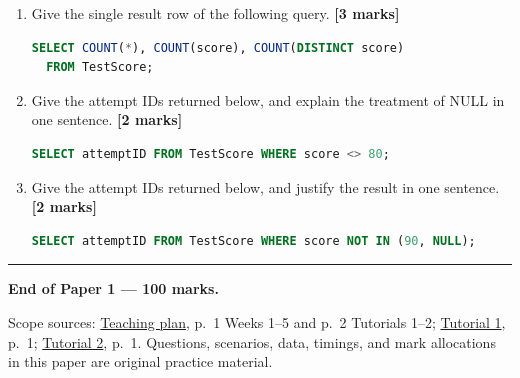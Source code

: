 \begin{enumerate}
\def\labelenumi{\arabic{enumi}.}
\item
  Give the single result row of the following query. \textbf{{[}3 marks{]}}

  \Needspace{60pt}
  \begin{lstlisting}[language=SQL]
  SELECT COUNT(*), COUNT(score), COUNT(DISTINCT score)
  FROM TestScore;
  \end{lstlisting}
\item
  Give the attempt IDs returned below, and explain the treatment of NULL in one sentence. \textbf{{[}2 marks{]}}

  \Needspace{45pt}
  \begin{lstlisting}[language=SQL]
  SELECT attemptID FROM TestScore WHERE score <> 80;
  \end{lstlisting}
\item
  Give the attempt IDs returned below, and justify the result in one sentence. \textbf{{[}2 marks{]}}

  \Needspace{45pt}
  \begin{lstlisting}[language=SQL]
  SELECT attemptID FROM TestScore WHERE score NOT IN (90, NULL);
  \end{lstlisting}
\end{enumerate}

\begin{center}\rule{0.5\linewidth}{0.5pt}\end{center}

\textbf{End of Paper 1 --- 100 marks.}

Scope sources: \href{../../../syllabus/CSC5041_Teaching_Plan.pdf}{Teaching plan}, p.~1 Weeks 1--5 and p.~2 Tutorials 1--2; \href{../../../slides/Tutorial1.pdf}{Tutorial 1}, p.~1; \href{../../../slides/Tutorial\%202.pdf}{Tutorial 2}, p.~1. Questions, scenarios, data, timings, and mark allocations in this paper are original practice material.
